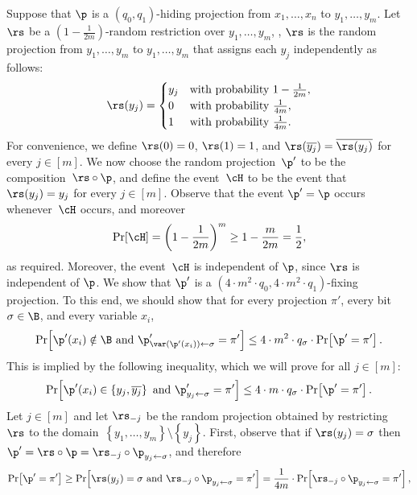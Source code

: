 Suppose that $\p$ is a $(q_{0},q_{1})$-hiding projection from $x_{1},\ldots,x_{n}$
to $y_{1},\ldots,y_{m}$. Let $\rs$ be a $\left(1-\frac{1}{2m}\right)$-random
restriction over $y_{1},\ldots,y_{m}$, \ie, $\rs$ is the random
projection from $y_{1},\ldots,y_{m}$ to $y_{1},\ldots,y_{m}$ that
assigns each $y_{j}$ independently as follows: 
\[
\rs(y_{j})=\begin{cases}
y_{j} & \text{with probability \ensuremath{1-\frac{1}{2m}}},\\
0 & \text{with probability \ensuremath{\frac{1}{4m}}},\\
1 & \text{with probability \ensuremath{\frac{1}{4m}}}.
\end{cases}
\]
For convenience, we define $\rs(0)=0$, $\rs(1)=1$, and $\rs(\overline{y_{j}})=\overline{\rs(y_{j})}$
for every $j\in\left[m\right]$. We now choose the random projection~$\p'$
to be the composition~$\rs\circ\p$, and define the event~$\cH$
to be the event that $\rs(y_{j})=y_{j}$ for every $j\in\left[m\right]$.
Observe that the event $\p'=\p$ occurs whenever~$\cH$ occurs, and
moreover 
\[
\Pr\!\left[\cH\right]=\left(1-\frac{1}{2m}\right)^{m}\ge1-\frac{m}{2m}=\frac{1}{2},
\]
as required. Moreover, the event~$\cH$ is independent of $\p$,
since $\rs$ is independent of $\p$. We show that $\p'$ is a $(4\cdot m^{2}\cdot q_{0},4\cdot m^{2}\cdot q_{1})$-fixing
projection. To this end, we should show that for every projection
$\pi'$, every bit $\sigma\in\B$, and every variable $x_{i}$, 
\begin{equation}
\Pr\!\left[\p'(x_{i})\notin\B\text{ and }\p_{\var(\p'(x_{i}))\gets\sigma}'=\pi'\right]\leq4\cdot m^{2}\cdot q_{\sigma}\cdot\Pr\!\left[\p'=\pi'\right].\label{eq:shrinkage-hiding-goal-after-summation}
\end{equation}
This is implied by the following inequality, which we will prove for
all $j\in\left[m\right]$: 
\begin{equation}
\Pr\!\left[\p'(x_{i})\in\left\{ y_{j},\overline{y_{j}}\right\} \text{ and }\p_{y_{j}\gets\sigma}'=\pi'\right]\leq4\cdot m\cdot q_{\sigma}\cdot\Pr\!\left[\p'=\pi'\right].\label{eq:shrinkage-hiding-goal}
\end{equation}
Let $j\in\left[m\right]$ and let $\rs_{-j}$ be the random projection
obtained by restricting~$\rs$ to the domain~$\left\{ y_{1},\ldots,y_{m}\right\} \setminus\left\{ y_{j}\right\} $.
First, observe that if $\rs(y_{j})=\sigma$ then $\p'=\rs\circ\p=\rs_{-j}\circ\p_{y_{j}\gets\sigma}$,
and therefore 
\[
\Pr\!\left[\p'=\pi'\right]\geq\Pr\!\left[\rs(y_{j})=\sigma\text{ and }\rs_{-j}\circ\p_{y_{j}\gets\sigma}=\pi'\right]=\frac{1}{4m}\cdot\Pr\!\left[\rs_{-j}\circ\p_{y_{j}\gets\sigma}=\pi'\right],
\]
